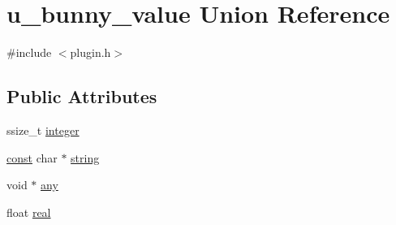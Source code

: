 \hypertarget{unionu__bunny__value}{\section{u\-\_\-bunny\-\_\-value Union Reference}
\label{unionu__bunny__value}
}


{\ttfamily \#include $<$plugin.\-h$>$}

\subsection*{Public Attributes}
\begin{DoxyCompactItemize}
\item 
ssize\-\_\-t \hyperlink{unionu__bunny__value_a4e4c4f6aae60a87d4bfed3058658d0a4}{integer}
\item 
\hyperlink{term__entry_8h_a57bd63ce7f9a353488880e3de6692d5a}{const} char $\ast$ \hyperlink{unionu__bunny__value_aa8a6bf15145c0cafc4c67353701228ac}{string}
\item 
void $\ast$ \hyperlink{unionu__bunny__value_a89d2a2af87226cec36e7ceeae10cae8f}{any}
\item 
float \hyperlink{unionu__bunny__value_a451a5ceae83c27a4110884d6460910c3}{real}
\end{DoxyCompactItemize}


